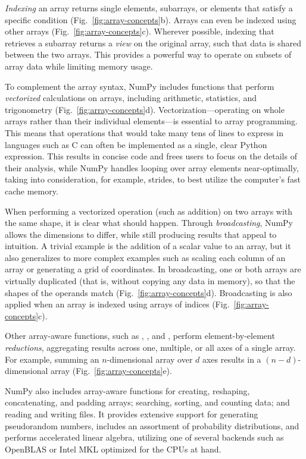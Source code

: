 \emph{Indexing} an array returns single elements, subarrays, or elements that satisfy
a specific condition (Fig.~\ref{fig:array-concepts}b).
Arrays can even be indexed using other arrays (Fig.~\ref{fig:array-concepts}c).
Wherever possible, indexing that retrieves a subarray returns a {\em view} on
the original array, such that data is shared between the two arrays.
This provides a powerful way to operate on subsets of array data while
limiting memory usage.

To complement the array syntax, NumPy includes functions that perform
\emph{vectorized} calculations on arrays, including arithmetic, statistics, and
trigonometry (Fig.~\ref{fig:array-concepts}d).
Vectorization---operating on whole arrays rather than their individual
elements---is essential to array programming.
This means that operations that would take many tens of lines to express in
languages such as C can often be implemented as a single, clear Python
expression.
This results in concise code and frees users to focus on the details of
their analysis, while NumPy handles looping over array elements near-optimally,
taking into consideration, for example, strides, to best utilize the
computer's fast cache memory.

When performing a vectorized operation (such as addition) on two arrays with
the same shape, it is clear what should happen.
Through \emph{broadcasting}, NumPy allows the dimensions to differ, while
still producing results that appeal to intuition.
A trivial example is the addition of a scalar value to an array, but it also
generalizes to more complex examples such as scaling each column of an array
or generating a grid of coordinates.
In broadcasting, one or both arrays are virtually duplicated (that is, without
copying any data in memory), so that the shapes of the operands match
(Fig.~\ref{fig:array-concepts}d).
Broadcasting is also applied when an array is indexed using arrays of
indices (Fig.~\ref{fig:array-concepts}c).

Other array-aware functions, such as , , and , perform
element-by-element \emph{reductions}, aggregating results across one,
multiple, or all axes of a single array.
For example, summing an $n$-dimensional array over $d$ axes results in a
$(n-d)$-dimensional array (Fig.~\ref{fig:array-concepts}e).

NumPy also includes array-aware functions for creating, reshaping, concatenating, and padding
arrays; searching, sorting, and counting data; and reading and writing files.
It provides extensive support for generating pseudorandom numbers,
includes an assortment of probability distributions, and
performs accelerated linear algebra, utilizing one of several backends
such as OpenBLAS \cite{wang2013augem,xianyi2012model} or Intel MKL optimized
for the CPUs at hand.

